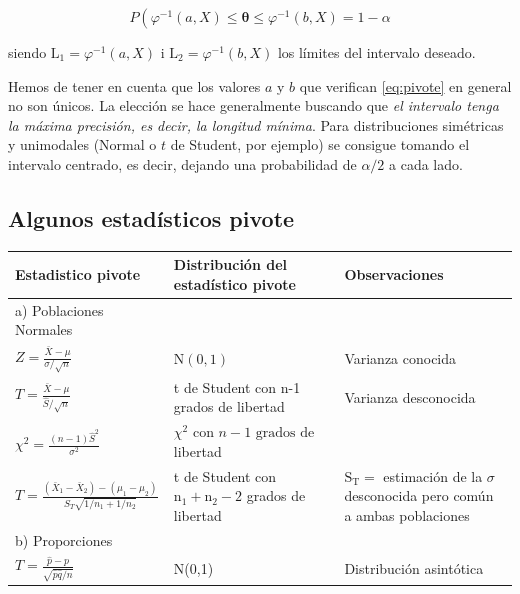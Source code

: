 \documentclass[
]{article}
\begin{document}
\[
P\left(\varphi^{-1}(a, X) \leq \boldsymbol{\theta} \leq \varphi^{-1}(b, X)=1-\alpha\right.
\]

siendo \(\mathrm{L}_{1}=\varphi^{-1}(a, X)\) i \(\mathrm{L}_{2}=\varphi^{-1}(b, X)\) los límites del intervalo deseado.

Hemos de tener en cuenta que los valores \(a\) y \(b\) que verifican \eqref{eq:pivote} en general no son únicos. La elección se hace generalmente buscando que \emph{el intervalo tenga la máxima precisión, es decir, la longitud mínima}. Para distribuciones simétricas y unimodales (Normal o \(t\) de Student, por ejemplo) se consigue tomando el intervalo centrado, es decir, dejando una probabilidad de \(\alpha / 2\) a cada lado.

\subsection{Algunos estadísticos pivote}\label{algunos-estaduxedsticos-pivote}

\begin{longtable}[]{@{}
  >{\centering\arraybackslash}p{}
  >{\centering\arraybackslash}p{}
  >{\centering\arraybackslash}p{}@{}}
\toprule\noalign{}
\begin{minipage}[b]{\linewidth}\centering
Estadistico pivote
\end{minipage} & \begin{minipage}[b]{\linewidth}\centering
Distribución del estadístico pivote
\end{minipage} & \begin{minipage}[b]{\linewidth}\centering
Observaciones
\end{minipage} \\
\midrule\noalign{}
\endhead
\bottomrule\noalign{}
\endlastfoot
a) Poblaciones Normales & & \\
\(Z=\frac{\bar{X}-\mu}{\sigma / \sqrt{n}}\) & \(\mathrm{N}(0,1)\) & Varianza conocida \\
\(T=\frac{\bar{X}-\mu}{\hat{S} / \sqrt{n}}\) & t de Student con n-1 grados de libertad & Varianza desconocida \\
\(\chi^{2}=\frac{(n-1) \hat{S}^{2}}{\sigma^{2}}\) & \(\chi^{2} \text { con } n-1 \text { grados de }\) libertad & \\
\(T=\frac{\left(\bar{X}_{1}-\bar{X}_{2}\right)-\left(\mu_{1}-\mu_{2}\right)}{S_{T} \sqrt{1 / n_{1}+1 / n_{2}}}\) & t de Student con \(\mathrm{n}_{1}+\mathrm{n}_{2}-2\) grados de libertad & \(\mathrm{S}_{\mathrm{T}}=\) estimación de la \(\sigma\) desconocida pero común a ambas poblaciones \\
b) Proporciones & & \\
\(T=\frac{\hat{p}-p}{\sqrt{\hat{p} \hat{q} / n}}\) & N(0,1) & Distribución asintótica \\
\end{longtable}
\end{document}
